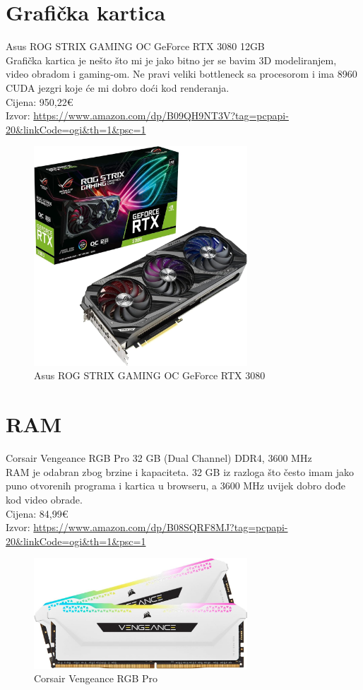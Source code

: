 \documentclass{report}
\begin{document}
\chapter{Grafička kartica}
Asus ROG STRIX GAMING OC GeForce RTX 3080 12GB
\\ Grafička kartica je nešto što mi je jako bitno jer se bavim 3D modeliranjem, video obradom i gaming-om. Ne pravi veliki bottleneck sa procesorom i ima 8960 CUDA jezgri koje će mi dobro doći kod renderanja.
\\Cijena: 950,22€
\\Izvor:  \url{https://www.amazon.com/dp/B09QH9NT3V?tag=pcpapi-20&linkCode=ogi&th=1&psc=1}
\begin{figure}[h]
\includegraphics[width=8cm]{slike/graficka.jpg}
\caption{Asus ROG STRIX GAMING OC GeForce RTX 3080}
\end{figure}

\chapter{RAM}
Corsair Vengeance RGB Pro 32 GB (Dual Channel) DDR4, 3600 MHz
\\ RAM je odabran zbog brzine i kapaciteta. 32 GB iz razloga što često imam jako puno otvorenih programa i kartica u browseru, a 3600 MHz uvijek dobro dođe kod video obrade.
\\Cijena: 84,99€
\\Izvor:  \url{https://www.amazon.com/dp/B08SQRF8MJ?tag=pcpapi-20&linkCode=ogi&th=1&psc=1}
\begin{figure}[h]
\includegraphics[width=8cm]{slike/ram.jpg}
\caption{Corsair Vengeance RGB Pro}
\end{figure}
\end{document}

